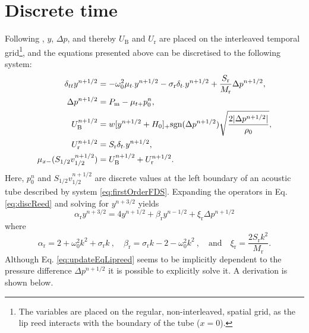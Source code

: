 \section{Discrete time}
\def\nph{}
\def\nphSys{n+1/2}

Following \cite{Harrison2018}, $y$, $\Delta p$, and thereby $U_\text{B}$ and $U_\text{r}$ are placed on the interleaved temporal grid\footnote{The variables are placed on the regular, non-interleaved, spatial grid, as the lip reed interacts with the boundary of the tube ($x=0$).}, and the equations presented above can be discretised to the following system:
\begin{subequations}\label{eq:discreteLipSystem}
    \begin{align}
        \delta_{tt}y^{\nphSys} &= -\omega_0^2\mu_{t\cdot}y^{\nphSys}-\sigma_\text{r}\delta_{t\cdot}y^{\nphSys} + \frac{S_\text{r}}{M_\rtxt}\Delta p^{\nphSys},\label{eq:discReed}\\
        \Delta p^{\nphSys} &= P_\text{m} - \mu_{t+}p_0^n,\label{eq:pDiff}\\
        U_\text{B}^{\nphSys} &= w[y^{\nphSys}+H_0]_+\text{sgn}(\Delta p^{\nphSys})\sqrt{\frac{2|\Delta p^{\nphSys}|}{\rho_0}},\label{eq:bernoulli}\\
        U_\text{r}^{\nphSys} &= S_\text{r}\delta_{t\cdot}y^{\nphSys},\label{eq:Ur}\\
        \mu_{x-}(S_{1/2}v_{1/2}^{\nphSys}) &= U_\text{B}^{\nphSys} + U_\text{r}^{\nphSys}.\label{eq:UbUr}
    \end{align}
\end{subequations}
Here, $p_0^n$ and $S_{1/2}v_{1/2}^{\nphSys}$ are discrete values at the left boundary of an acoustic tube described by system \eqref{eq:firstOrderFDS}. Expanding the operators in Eq. \eqref{eq:discReed} and solving for $y^{n+3/2}$ yields
\begin{equation}\label{eq:updateEqLipreed}
    \alpha_\text{r}y^{n+3/2} = 4y^{n+1/2} + \beta_\text{r}y^{n-1/2} + \xi_\text{r}\Delta p^{n+1/2}
\end{equation}
where
\begin{equation}
    \alpha_\text{r} = 2 + \omega_0^2k^2 + \sigma_\text{r} k\ , \quad \beta_\text{r} =  \sigma_\text{r} k - 2 - \omega_0^2 k^2\ , \quad \text{and} \quad \xi_\text{r} = \frac{2 S_\text{r}k^2}{M_\text{r}}.
\end{equation}
Although Eq. \eqref{eq:updateEqLipreed} seems to be implicitly dependent to the pressure difference $\Delta p^{n+1/2}$ it is possible to explicitly solve it. A derivation is shown below.


